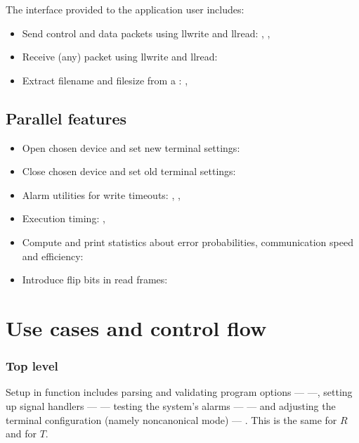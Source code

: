 \documentclass[main.tex]{subfiles}
\begin{document}
The interface provided to the application user includes:

\begin{itemize}[noitemsep,rightmargin=3em]
	\item Send control and data packets using llwrite and llread: , , 
	\item Receive (any) packet using llwrite and llread:
	\item Extract filename and filesize from a : , 
\end{itemize}

\subsection{Parallel features}
\label{subsec:parallelarch}

\begin{itemize}[noitemsep,rightmargin=3em]
	\item Open chosen device and set new terminal settings: 
	\item Close chosen device and set old terminal settings: 
	\item Alarm utilities for write timeouts: , , 
	\item Execution timing: , 
	\item Compute and print statistics about error probabilities, communication speed and efficiency: 
	\item Introduce flip bits in read frames: 
\end{itemize}

\section{Use cases and control flow}
\label{sec:usecases}

\subsubsection{Top level}

Setup in function  includes parsing and validating program options ---  ---, setting up signal handlers ---  --- testing the system's alarms ---  --- and adjusting the terminal configuration (namely noncanonical mode) --- . This is the same for $R$ and for $T$.
\end{document}
